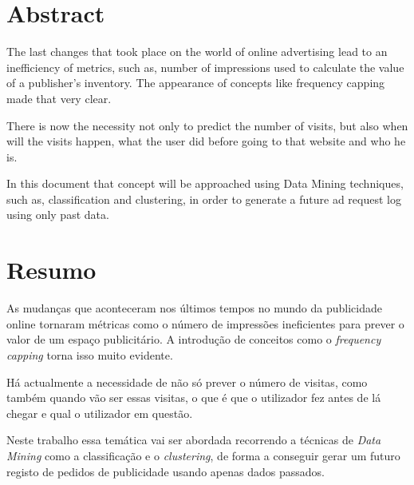 \chapter*{Abstract}

The last changes that took place on the world of online advertising lead to an inefficiency of metrics, such as, number of impressions used to calculate the value
of a publisher's inventory. The appearance of concepts like frequency capping made that very clear.

There is now the necessity not only to predict the number of visits, but also when will the visits happen, what the user did before going to that
website and who he is.

In this document that concept will be approached using Data Mining techniques, such as, classification and clustering, in order to generate a future ad request log
using only past data.

\chapter*{Resumo}

As mudanças que aconteceram nos últimos tempos no mundo da publicidade online tornaram métricas como o número de impressões ineficientes para prever o valor de um
espaço publicitário. A introdução de conceitos como o \textit{frequency capping} torna isso muito evidente.

Há actualmente a necessidade de não só prever o número de visitas, como também quando vão ser essas visitas, o que é que o utilizador fez antes de lá chegar e qual
o utilizador em questão. 

Neste trabalho essa temática vai ser abordada recorrendo a técnicas de \textit{Data Mining} como a classificação e o \textit{clustering}, de forma a conseguir gerar
um futuro registo de pedidos de publicidade usando apenas dados passados.
